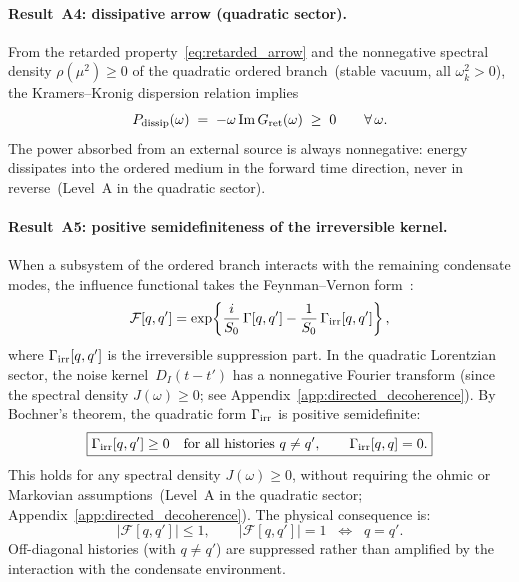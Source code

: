 \documentclass[11pt,a4paper]{article}
\numberwithin{equation}{section}
\begin{document}
\paragraph{Result~A4: dissipative arrow (quadratic sector).}
From the retarded property~\eqref{eq:retarded_arrow} and the
nonnegative spectral density $\rho(\mu^2)\geq 0$ of the quadratic
ordered branch~(stable vacuum, all $\omega_k^2>0$),
the Kramers--Kronig dispersion relation implies
\begin{equation}
  P_{\rm dissip}(\omega)
  \;=\; -\omega\,{\rm Im}\,G_{\rm ret}(\omega)
  \;\geq\; 0
  \qquad\forall\,\omega.
  \label{eq:dissip_arrow}
\end{equation}
The power absorbed from an external source is always
nonnegative: energy dissipates into the ordered
medium in the forward time direction, never in
reverse~(Level~A in the quadratic sector).

\paragraph{Result~A5: positive semidefiniteness of the
irreversible kernel.}
When a subsystem of the ordered branch interacts with the remaining
condensate modes, the influence functional takes the
Feynman--Vernon form~\cite{FeynmanVernon1963}:
\begin{equation}
  \mathcal{F}[q,q'] = \exp\!\left\{
    \frac{i}{S_0}\,\Gamma[q,q']
    - \frac{1}{S_0}\,\Gamma_{\rm irr}[q,q']\right\},
  \label{eq:influence_A5}
\end{equation}
where $\Gamma_{\rm irr}[q,q']$ is the irreversible suppression part.
In the quadratic Lorentzian sector, the noise kernel~$D_I(t-t')$ has a
nonnegative Fourier transform (since the spectral density
$J(\omega)\geq 0$; see Appendix~\ref{app:directed_decoherence}).
By Bochner's theorem, the quadratic form $\Gamma_{\rm irr}$ is
positive semidefinite:
\begin{equation}
  \boxed{\Gamma_{\rm irr}[q,q'] \geq 0
  \quad\text{for all histories } q\neq q',
  \qquad
  \Gamma_{\rm irr}[q,q] = 0.}
  \label{eq:Gamma_irr_positive}
\end{equation}
This holds for any spectral density $J(\omega)\geq 0$, without
requiring the ohmic or Markovian assumptions~(Level~A in the
quadratic sector; Appendix~\ref{app:directed_decoherence}).
The physical consequence is:
\begin{equation}
  |\mathcal{F}[q,q']| \leq 1,
  \qquad
  |\mathcal{F}[q,q']| = 1
  \;\;\Leftrightarrow\;\;
  q = q'.
  \label{eq:F_bound}
\end{equation}
Off-diagonal histories (with $q\neq q'$) are suppressed rather than
amplified by the interaction with the condensate environment.
\end{document}
